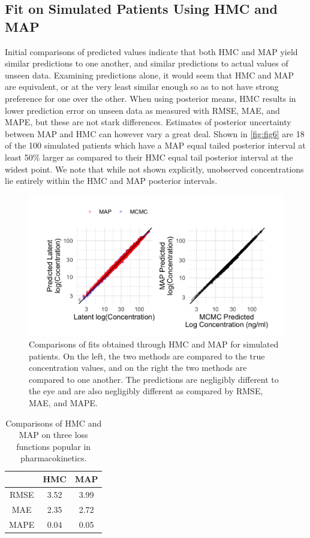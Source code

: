 \subsection*{Fit on Simulated Patients Using HMC and MAP}

Initial comparisons of predicted values indicate that both HMC and MAP yield similar predictions to one another, and similar predictions to actual values of unseen data.  Examining predictions alone, it would seem that HMC and MAP are equivalent, or at the very least similar enough so as to not have strong preference for one over the other. When using posterior means, HMC results in lower prediction error on unseen data as measured with RMSE, MAE, and MAPE, but these are not stark differences. Estimates of posterior uncertainty between MAP and HMC can however vary a great deal.   Shown in \cref{fig:fig6} are 18 of the 100 simulated patients which have a MAP equal tailed posterior interval at least 50\% larger as compared to their HMC equal tail posterior interval at the widest point. We note that while not shown explicitly, unobserved concentrations lie entirely within the HMC and MAP posterior intervals.

\begin{figure}
	\centering
	\includegraphics[width=0.85\linewidth]{figs/compare}
	\caption{Comparisons of fits obtained through HMC and MAP for simulated patients.  On the left, the two methods are compared to the true concentration values, and on the right the two methods are compared to one another.  The predictions are negligibly different to the eye and are also negligibly different as compared by RMSE, MAE, and MAPE.}
	\label{fig:fig5}
\end{figure}


\begin{table}
	\centering
\begin{tabular}{|c|c|c|}
	\hline 
	& HMC & MAP \\ 
	\hline 
	RMSE & 3.52 & 3.99 \\ 
	\hline 
	MAE & 2.35 & 2.72 \\ 
	\hline 
	MAPE & 0.04 & 0.05 \\ 
	\hline 
\end{tabular} 
\caption{Comparisons of HMC and MAP on three loss functions popular in pharmacokinetics.}
\end{table}

